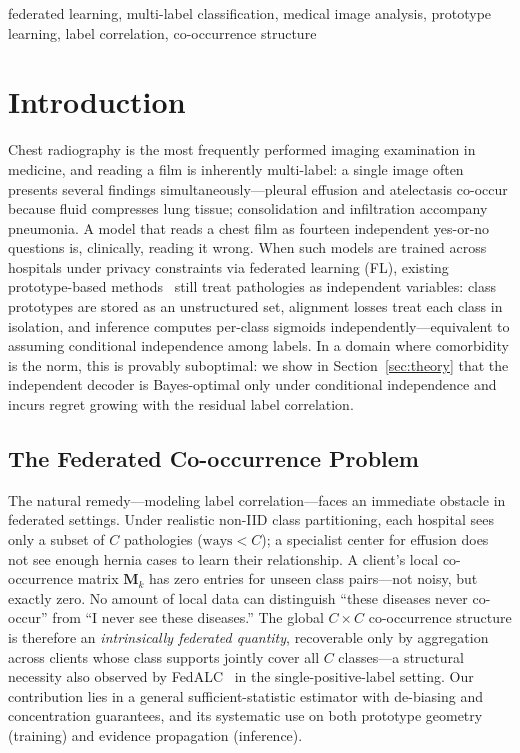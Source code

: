 \documentclass[conference]{IEEEtran}
\theoremstyle{definition}
\begin{document}
\begin{IEEEkeywords}
federated learning, multi-label classification, medical image analysis, prototype learning, label correlation, co-occurrence structure
\end{IEEEkeywords}

\section{Introduction}

Chest radiography is the most frequently performed imaging examination in medicine, and reading a film is inherently multi-label: a single image often presents several findings simultaneously---pleural effusion and atelectasis co-occur because fluid compresses lung tissue; consolidation and infiltration accompany pneumonia. A model that reads a chest film as fourteen independent yes-or-no questions is, clinically, reading it wrong. When such models are trained across hospitals under privacy constraints via federated learning (FL), existing prototype-based methods~\cite{tan2022fedproto,zhang2024fedgmkd,chen2021fedbe} still treat pathologies as independent variables: class prototypes are stored as an unstructured set, alignment losses treat each class in isolation, and inference computes per-class sigmoids independently---equivalent to assuming conditional independence among labels. In a domain where comorbidity is the norm, this is provably suboptimal: we show in Section~\ref{sec:theory} that the independent decoder is Bayes-optimal only under conditional independence and incurs regret growing with the residual label correlation.

\subsection{The Federated Co-occurrence Problem}

The natural remedy---modeling label correlation---faces an immediate obstacle in federated settings. Under realistic non-IID class partitioning, each hospital sees only a subset of $C$ pathologies ($\text{ways}<C$); a specialist center for effusion does not see enough hernia cases to learn their relationship. A client's local co-occurrence matrix $\mathbf{M}_k$ has zero entries for unseen class pairs---not noisy, but exactly zero. No amount of local data can distinguish ``these diseases never co-occur'' from ``I never see these diseases.'' The global $C{\times}C$ co-occurrence structure is therefore an \emph{intrinsically federated quantity}, recoverable only by aggregation across clients whose class supports jointly cover all $C$ classes---a structural necessity also observed by FedALC~\cite{an2024fedalc} in the single-positive-label setting. Our contribution lies in a general sufficient-statistic estimator with de-biasing and concentration guarantees, and its systematic use on both prototype geometry (training) and evidence propagation (inference).
\end{document}
